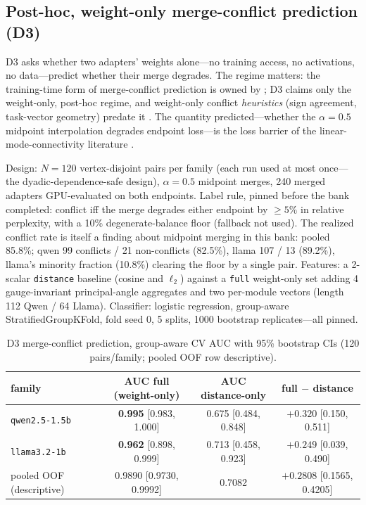\documentclass[10pt]{article}
\begin{document}
\subsection{Post-hoc, weight-only merge-conflict prediction (D3)}
\label{sec:d3}

D3 asks whether two adapters' weights alone---no training access, no
activations, no data---predict whether their merge degrades. The regime
matters: the training-time form of merge-conflict prediction is owned by
\cite{mergeprobe2026}; D3 claims only the weight-only, post-hoc regime, and
weight-only conflict \emph{heuristics} (sign agreement, task-vector
geometry) predate it \cite{yadav2023ties,ilharco2023task}. The quantity
predicted---whether the $\alpha = 0.5$ midpoint interpolation degrades
endpoint loss---is the loss barrier of the linear-mode-connectivity
literature \cite{frankle2020lmc,ainsworth2023rebasin}.

Design: $N = 120$ vertex-disjoint pairs per family (each run used at most
once---the dyadic-dependence-safe design), $\alpha = 0.5$ midpoint merges,
240 merged adapters GPU-evaluated on both endpoints. Label rule, pinned
before the bank completed: conflict iff the merge degrades either endpoint
by $\ge 5\%$ in relative perplexity, with a 10\% degenerate-balance floor
(fallback not used). The realized conflict rate is itself a finding about
midpoint merging in this bank: pooled 85.8\%; qwen 99 conflicts / 21
non-conflicts (82.5\%), llama 107 / 13 (89.2\%), llama's minority fraction
(10.8\%) clearing the floor by a single pair. Features:
a 2-scalar \texttt{distance} baseline (cosine and $\ell_2$) against a
\texttt{full} weight-only set adding 4 gauge-invariant principal-angle
aggregates and two per-module vectors (length 112 Qwen / 64 Llama).
Classifier: logistic regression, group-aware StratifiedGroupKFold, fold
seed 0, 5 splits, 1000 bootstrap replicates---all pinned.

\begin{table}[ht]
\centering
\small
\caption{D3 merge-conflict prediction, group-aware CV AUC with 95\%
bootstrap CIs (120 pairs/family; pooled OOF row descriptive).}
\label{tab:d3}
\begin{tabular}{lccc}
\toprule
family & AUC full (weight-only) & AUC distance-only & full $-$ distance \\
\midrule
\texttt{qwen2.5-1.5b} & \textbf{0.995} [0.983, 1.000] & 0.675 [0.484, 0.848] & $+0.320$ [0.150, 0.511] \\
\texttt{llama3.2-1b} & \textbf{0.962} [0.898, 0.999] & 0.713 [0.458, 0.923] & $+0.249$ [0.039, 0.490] \\
pooled OOF (descriptive) & 0.9890 [0.9730, 0.9992] & 0.7082 & $+0.2808$ [0.1565, 0.4205] \\
\bottomrule
\end{tabular}
\end{table}
\end{document}
